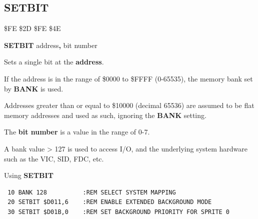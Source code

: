 \subsection{SETBIT}
\begin{description}[leftmargin=2cm,style=nextline]
\item [Token:] \$FE \$2D \$FE \$4E
\item [Format:] {\bf SETBIT} address{\bf,} bit number
\item [Usage:]  Sets a single bit at the {\bf address}.

                If the address is in the range of \$0000 to \$FFFF (0-65535), the
                memory bank set by {\bf BANK} is used.

                Addresses greater than or equal to \$10000 (decimal 65536)
                are assumed to be flat memory
                addresses and used as such, ignoring the {\bf BANK} setting.

                The {\bf bit number} is a value in the range of 0-7.

                 A bank value > 127 is used to access I/O,
                 and the underlying system hardware such as the
                 VIC, SID, FDC, etc.


\item [Example:] Using {\bf SETBIT}

\begin{tcolorbox}[colback=black,coltext=white]
\verbatimfont{\codefont}
\begin{verbatim}
 10 BANK 128          :REM SELECT SYSTEM MAPPING
 20 SETBIT $D011,6    :REM ENABLE EXTENDED BACKGROUND MODE
 30 SETBIT $D01B,0    :REM SET BACKGROUND PRIORITY FOR SPRITE 0
\end{verbatim}
\end{tcolorbox}
\end{description}


\newpage

